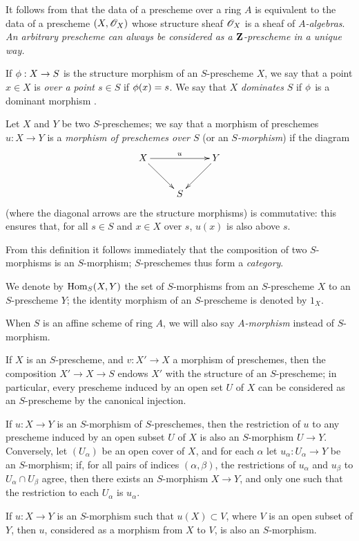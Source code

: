 It follows from  that the data of a prescheme over a ring $A$ is
equivalent to the data of a prescheme $(X,\mathscr{O}_X)$ whose structure sheaf $\mathscr{O}_X$ is
a sheaf of {\em $A$-algebras}. {\em An arbitrary prescheme can always be
considered as a $\mathbf{Z}$-prescheme in a unique way.}

If $\phi:X\to S$ is the structure morphism of an $S$-prescheme $X$, we
say that a point $x\in X$ is {\em over a point $s\in S$} if $\phi(x)=s$. We
say that $X$ {\em dominates} $S$ if $\phi$ is a dominant morphism .

\begin{env}[2.5.2]
\label{1.2.5.2}
Let $X$ and $Y$ be two $S$-preschemes; we say that a morphism
of preschemes $u:X\to Y$ is a {\em morphism of preschemes over $S$} (or
an {\em $S$-morphism}) if the diagram
\[
  \xymatrix{
    X \ar[rr]^u \ar[dr] & & Y\ar[dl]\\
    & S &
  }
\]
(where the diagonal arrows are the structure morphisms) is
commutative: this ensures that, for all $s\in S$ and $x\in X$ over $s$, $u(x)$
is also above $s$.
\end{env}

From this definition it follows immediately that the composition of two
$S$-morphisms is an $S$-morphism; $S$-preschemes thus form a {\em category}.

We denote by ${\mathop{\mathrm{Hom}}\nolimits}_S(X,Y)$ the set of $S$-morphisms from an $S$-prescheme $X$ to
an $S$-prescheme $Y$; the identity morphism of an $S$-prescheme is denoted by
$1_X$.

When $S$ is an affine scheme of ring $A$, we will also say {\em $A$-morphism}
instead of $S$-morphism.

\begin{env}[2.5.3]
\label{1.2.5.3}
If $X$ is an $S$-prescheme, and $v:X'\to X$ a morphism of preschemes,
then the composition $X'\to X\to S$ endows $X'$ with the structure of an $S$-prescheme;
in particular, every prescheme induced by an open set $U$ of $X$ can be considered as an
$S$-prescheme by the canonical injection.

If $u:X\to Y$ is an $S$-morphism of $S$-preschemes, then the restriction
of $u$ to any prescheme induced by an open subset $U$ of $X$ is also an
$S$-morphism $U\to Y$. Conversely, let $(U_\alpha)$ be an open cover of $X$,
and for each $\alpha$ let $u_\alpha:U_\alpha\to Y$ be an $S$-morphism; if,
for all pairs of indices $(\alpha,\beta)$, the restrictions of $u_\alpha$ and
$u_\beta$ to $U_\alpha\cap U_\beta$ agree, then there exists an $S$-morphism
$X\to Y$, and only one such that the restriction to each $U_\alpha$ is
$u_\alpha$.

If $u:X\to Y$ is an $S$-morphism such that $u(X)\subset V$, where $V$ is
an open subset of $Y$, then $u$, considered as a morphism from $X$ to $V$, is
also an $S$-morphism.
\end{env}

